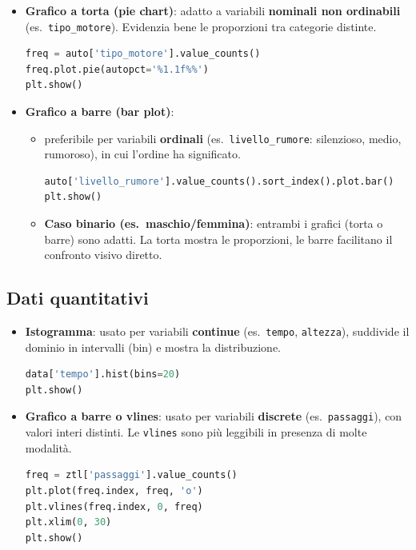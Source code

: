 \documentclass{article}
\begin{document}
\begin{itemize}
  \item \textbf{Grafico a torta (pie chart)}: adatto a variabili \textbf{nominali non ordinabili} (es.\ \texttt{tipo\_motore}). Evidenzia bene le proporzioni tra categorie distinte.
  \begin{lstlisting}[language=Python]
freq = auto['tipo_motore'].value_counts()
freq.plot.pie(autopct='%1.1f%%')
plt.show()
  \end{lstlisting}

  \item \textbf{Grafico a barre (bar plot)}: 
  
  \begin{itemize}
    \item preferibile per variabili \textbf{ordinali} (es.\ \texttt{livello\_rumore}: silenzioso, medio, rumoroso), in cui l'ordine ha significato.
  \begin{lstlisting}[language=Python]
auto['livello_rumore'].value_counts().sort_index().plot.bar()
plt.show()
  \end{lstlisting}
  \item \textbf{Caso binario (es.\ maschio/femmina)}: entrambi i grafici (torta o barre) sono adatti. La torta mostra le proporzioni, le barre facilitano il confronto visivo diretto.
  \end{itemize}
\end{itemize}

\subsection*{Dati quantitativi}

\begin{itemize}
  \item \textbf{Istogramma}: usato per variabili \textbf{continue} (es.\ \texttt{tempo}, \texttt{altezza}), suddivide il dominio in intervalli (bin) e mostra la distribuzione.
  \begin{lstlisting}[language=Python]
data['tempo'].hist(bins=20)
plt.show()
  \end{lstlisting}

  \item \textbf{Grafico a barre o vlines}: usato per variabili \textbf{discrete} (es.\ \texttt{passaggi}), con valori interi distinti. Le \texttt{vlines} sono più leggibili in presenza di molte modalità.
  \begin{lstlisting}[language=Python]
freq = ztl['passaggi'].value_counts()
plt.plot(freq.index, freq, 'o')
plt.vlines(freq.index, 0, freq)
plt.xlim(0, 30)
plt.show()
  \end{lstlisting}
\end{itemize}
\end{document}

